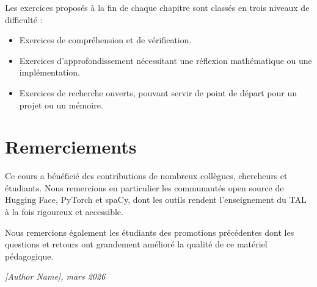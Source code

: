 Les exercices propos\'es \`a la fin de chaque chapitre sont class\'es en trois
niveaux de difficult\'e :
\begin{itemize}
    \item[$\star$] Exercices de compr\'ehension et de v\'erification.
    \item[$\star\star$] Exercices d'approfondissement n\'ecessitant une
          r\'eflexion math\'ematique ou une impl\'ementation.
    \item[$\star\star\star$] Exercices de recherche ouverts, pouvant servir de
          point de d\'epart pour un projet ou un m\'emoire.
\end{itemize}

\section*{Remerciements}

Ce cours a b\'en\'efici\'e des contributions de nombreux coll\`egues,
chercheurs et \'etudiants. Nous remercions en particulier les communaut\'es
open source de Hugging Face, PyTorch et spaCy, dont les outils rendent
l'enseignement du TAL \`a la fois rigoureux et accessible.

Nous remercions \'egalement les \'etudiants des promotions pr\'ec\'edentes
dont les questions et retours ont grandement am\'elior\'e la qualit\'e de ce
mat\'eriel p\'edagogique.

\vfill
\begin{flushright}
\textit{[Author Name], mars 2026}
\end{flushright}
